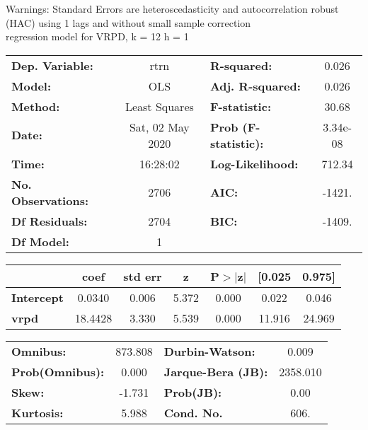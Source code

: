 Warnings: \newline
 [1] Standard Errors are heteroscedasticity and autocorrelation robust (HAC) using 1 lags and without small sample correction\\ 

regression model for VRPD, k = 12 h = 1\begin{center}
\begin{tabular}{lclc}
\toprule
\textbf{Dep. Variable:}    &       rtrn       & \textbf{  R-squared:         } &     0.026   \\
\textbf{Model:}            &       OLS        & \textbf{  Adj. R-squared:    } &     0.026   \\
\textbf{Method:}           &  Least Squares   & \textbf{  F-statistic:       } &     30.68   \\
\textbf{Date:}             & Sat, 02 May 2020 & \textbf{  Prob (F-statistic):} &  3.34e-08   \\
\textbf{Time:}             &     16:28:02     & \textbf{  Log-Likelihood:    } &    712.34   \\
\textbf{No. Observations:} &        2706      & \textbf{  AIC:               } &    -1421.   \\
\textbf{Df Residuals:}     &        2704      & \textbf{  BIC:               } &    -1409.   \\
\textbf{Df Model:}         &           1      & \textbf{                     } &             \\
\bottomrule
\end{tabular}
\begin{tabular}{lcccccc}
                   & \textbf{coef} & \textbf{std err} & \textbf{z} & \textbf{P$> |$z$|$} & \textbf{[0.025} & \textbf{0.975]}  \\
\midrule
\textbf{Intercept} &       0.0340  &        0.006     &     5.372  &         0.000        &        0.022    &        0.046     \\
\textbf{vrpd}      &      18.4428  &        3.330     &     5.539  &         0.000        &       11.916    &       24.969     \\
\bottomrule
\end{tabular}
\begin{tabular}{lclc}
\textbf{Omnibus:}       & 873.808 & \textbf{  Durbin-Watson:     } &    0.009  \\
\textbf{Prob(Omnibus):} &   0.000 & \textbf{  Jarque-Bera (JB):  } & 2358.010  \\
\textbf{Skew:}          &  -1.731 & \textbf{  Prob(JB):          } &     0.00  \\
\textbf{Kurtosis:}      &   5.988 & \textbf{  Cond. No.          } &     606.  \\
\bottomrule
\end{tabular}
\end{center}

